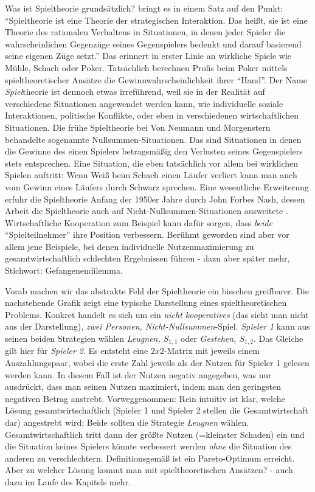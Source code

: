 Was ist Spieltheorie grundsätzlich? \textcite[S. 136]{Harsanyi1994} bringt es in einem Satz auf den Punkt: "`Spieltheorie ist eine Theorie der strategischen Interaktion. Das heißt, sie ist eine Theorie des rationalen Verhaltens in Situationen, in denen jeder Spieler die wahrscheinlichen Gegenzüge seines Gegenspielers bedenkt und darauf basierend seine eigenen Züge setzt."' Das erinnert in erster Linie an wirkliche Spiele wie Mühle, Schach oder Poker. Tatsächlich berechnen Profis beim Poker mittels spieltheoretischer Ansätze die Gewinnwahrscheinlichkeit ihrer "`Hand"'. Der Name \textit{Spiel}theorie ist dennoch etwas irreführend, weil sie in der Realität auf verschiedene Situationen angewendet werden kann, wie individuelle soziale Interaktionen, politische Konflikte, oder eben in verschiedenen wirtschaftlichen Situationen. Die frühe Spieltheorie bei Von Neumann und Morgenstern behandelte sogenannte Nullsummen-Situationen. Das sind Situationen in denen die Gewinne des einen Spielers betragsmäßig den Verlusten seines Gegenspielers stets entsprechen. Eine Situation, die eben tatsächlich vor allem bei wirklichen Spielen auftritt: Wenn Weiß beim Schach einen Läufer verliert kann man auch vom Gewinn eines Läufers durch Schwarz sprechen. Eine wesentliche Erweiterung erfuhr die Spieltheorie Anfang der 1950er Jahre durch John Forbes Nash, dessen Arbeit die Spieltheorie auch auf Nicht-Nullsummen-Situationen ausweitete \parencite[S. 163]{Nash1994}. Wirtschaftliche Kooperation zum Beispiel kann dafür sorgen, dass \textit{beide} "`Spielteilnehmer"' ihre Position verbessern. Berühmt geworden sind aber vor allem jene Beispiele, bei denen individuelle Nutzenmaximierung zu gesamtwirtschaftlich schlechten Ergebnissen führen - dazu aber später mehr, Stichwort: Gefangenendilemma.

Vorab machen wir das abstrakte Feld der Spieltheorie ein bisschen greifbarer. Die nachstehende Grafik zeigt eine typische Darstellung eines spieltheoretischen Problems. Konkret handelt es sich um ein \textit{nicht kooperatives} (das sieht man nicht aus der Darstellung), \textit{zwei Personen, Nicht-Nullsummen}-Spiel. \textit{Spieler 1} kann aus seinen beiden Strategien wählen \textit{Leugnen, $S_{1,1}$} oder \textit{Gestehen, $S_{1,2}$}. Das Gleiche gilt hier für \textit{Spieler 2}. Es entsteht eine $2x2$-Matrix mit jeweils einem Auszahlungspaar, wobei die erste Zahl jeweils als der Nutzen für Spieler 1 gelesen werden kann. In diesem Fall ist der Nutzen negativ angegeben, was nur ausdrückt, dass man seinen Nutzen maximiert, indem man den geringsten negativen Betrag anstrebt. Vorweggenommen: Rein intuitiv ist klar, welche Lösung gesamtwirtschaftlich (Spieler 1 und Spieler 2 stellen die Gesamtwirtschaft dar) angestrebt wird: Beide sollten die Strategie \textit{Leugnen} wählen. Gesamtwirtschaftlich tritt dann der größte Nutzen (=kleinster Schaden) ein und die Situation keines Spielers könnte verbessert werden \textit{ohne} die Situation des anderen zu verschlechtern. Definitionsgemäß ist ein Pareto-Optimum erreicht. Aber zu welcher Lösung kommt man mit spieltheoretischen Ansätzen? - auch dazu im Laufe des Kapitels mehr.


